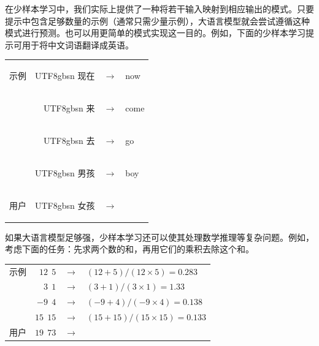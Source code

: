 在少样本学习中，我们实际上提供了一种将若干输入映射到相应输出的模式。只要提示中包含足够数量的示例（通常只需少量示例），大语言模型就会尝试遵循这种模式进行预测。也可以用更简单的模式实现这一目的。例如，下面的少样本学习提示可用于将中文词语翻译成英语。

\vspace{0.5em}
\begin{tcolorbox}

\begingroup
\renewcommand{\arraystretch}{1.0}
\setlength{\tabcolsep}{6pt}
\begin{tabular}{r r c l}
\hspace{0.5em} {\color{gray} \footnotesize{示例}} & \begin{CJK*}{UTF8}{gbsn} 现在 \end{CJK*} & $\to$ & now \\
& \begin{CJK*}{UTF8}{gbsn} 来 \end{CJK*} & $\to$ & come\\
& \begin{CJK*}{UTF8}{gbsn} 去 \end{CJK*} & $\to$ & go\\
& \begin{CJK*}{UTF8}{gbsn} 男孩 \end{CJK*} & $\to$ & boy\\
{\color{gray} \footnotesize{用户}} & \begin{CJK*}{UTF8}{gbsn} 女孩 \end{CJK*} & $\to$ & \underline{\hspace{2em}}\\
\end{tabular}
\endgroup

\end{tcolorbox}
\vspace{0.5em}

如果大语言模型足够强，少样本学习还可以使其处理数学推理等复杂问题。例如，考虑下面的任务：先求两个数的和，再用它们的乘积去除这个和。

\vspace{0.5em}
\begin{tcolorbox}

\begingroup
\renewcommand{\arraystretch}{1.0}
\setlength{\tabcolsep}{6pt}
\begin{tabular}{r r c l}
\hspace{0.5em} {\color{gray} \footnotesize{示例}} & $12\ \ 5$ & $\to$ & $(12 + 5)/(12 \times 5) = 0.283$ \\
& $3\ \ 1$ & $\to$ & $(3 + 1)/(3 \times 1) = 1.33$ \\
& $-9\ \ 4$ & $\to$ & $(-9 + 4)/(-9 \times 4) = 0.138$ \\
& $15\ \ 15$ & $\to$ & $(15 + 15)/(15 \times 15) = 0.133$ \\
{\color{gray} \footnotesize{用户}} & $19\ \ 73$ & $\to$ & \underline{\hspace{2em}}\\
\end{tabular}
\endgroup

\end{tcolorbox}
\vspace{0.5em}

